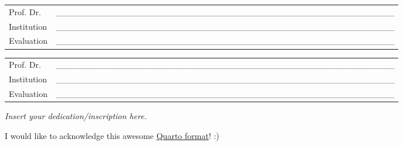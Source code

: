 \begin{folhadeaprovacao}
\vspace*{0.5cm}

\noindent
\begin{tabular}{m{2cm} P{14cm}}
  Prof. Dr. & \_\_\_\_\_\_\_\_\_\_\_\_\_\_\_\_\_\_\_\_\_\_\_\_\_\_\_\_\_\_\_\_\_\_\_\_\_\_\_\_\_\_\_\_\_\_\_\_\_\_\_\_\_\_\_ \\
  Institution & \_\_\_\_\_\_\_\_\_\_\_\_\_\_\_\_\_\_\_\_\_\_\_\_\_\_\_\_\_\_\_\_\_\_\_\_\_\_\_\_\_\_\_\_\_\_\_\_\_\_\_\_\_\_\_ \\
  Evaluation & \_\_\_\_\_\_\_\_\_\_\_\_\_\_\_\_\_\_\_\_\_\_\_\_\_\_\_\_\_\_\_\_\_\_\_\_\_\_\_\_\_\_\_\_\_\_\_\_\_\_\_\_\_\_\_ \\
\end{tabular}

\vspace*{0.5cm}

\noindent
\begin{tabular}{m{2cm} P{14cm}}
  Prof. Dr. & \_\_\_\_\_\_\_\_\_\_\_\_\_\_\_\_\_\_\_\_\_\_\_\_\_\_\_\_\_\_\_\_\_\_\_\_\_\_\_\_\_\_\_\_\_\_\_\_\_\_\_\_\_\_\_ \\
  Institution & \_\_\_\_\_\_\_\_\_\_\_\_\_\_\_\_\_\_\_\_\_\_\_\_\_\_\_\_\_\_\_\_\_\_\_\_\_\_\_\_\_\_\_\_\_\_\_\_\_\_\_\_\_\_\_ \\
  Evaluation & \_\_\_\_\_\_\_\_\_\_\_\_\_\_\_\_\_\_\_\_\_\_\_\_\_\_\_\_\_\_\_\_\_\_\_\_\_\_\_\_\_\_\_\_\_\_\_\_\_\_\_\_\_\_\_ \\
\end{tabular}
\end{folhadeaprovacao}


\begin{dedicatoria}
  \vspace*{\fill}
  \centering
  \noindent
  \textit{
  Insert your dedication/inscription here.
  }
	\vspace*{\fill}
\end{dedicatoria}


\begin{agradecimentos}
  \noindent
  I would like to acknowledge this awesome \href{https://github.com/danielvartan/tesesusp}{Quarto format}! :)
\end{agradecimentos}

